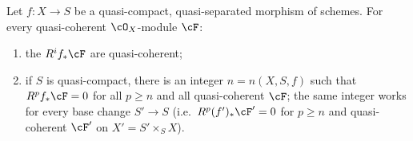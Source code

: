 \begin{lemma}
\label{lem:pc-finite-support-hi}
Let $f:X\to S$ be a quasi-compact, quasi-separated morphism of schemes.
For every quasi-coherent $\cO_X$-module $\cF$:
\begin{enumerate}
\item the $R^if_*\cF$ are quasi-coherent;
\item if $S$ is quasi-compact, there is an integer $n=n(X,S,f)$ such
that $R^pf_*\cF=0$ for all $p\ge n$ and all quasi-coherent $\cF$; the
same integer works for every base change
$S'\to S$ (i.e.\ $R^p(f')_*\cF'=0$ for $p\ge n$ and quasi-coherent
$\cF'$ on $X'=S'\times_SX$).
\end{enumerate}
\end{lemma}
